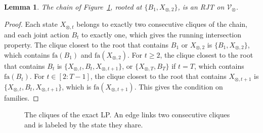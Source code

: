 \documentclass{article}
\newtheorem{lemma}{Lemma}
\begin{document}
\begin{lemma}\label{lem:chain-rjt}
The chain of Figure~\ref{fig:clique-chain}, rooted at $\{B_1, X_{\otimes,2}\}$, is an RJT on $\mathcal{V}_\otimes$.
\end{lemma}
\begin{proof}
Each state $X_{\otimes,t}$ belongs to exactly two consecutive cliques of the chain, and each joint action $B_t$ to
exactly one, which gives the running intersection property. The clique closest to the root that contains $B_1$ or
$X_{\otimes,2}$ is $\{B_1, X_{\otimes,2}\}$, which contains $\mathrm{fa}(B_1)$ and $\mathrm{fa}(X_{\otimes,2})$. For $t
\ge 2$, the clique closest to the root that contains $B_t$ is $\{X_{\otimes,t}, B_t, X_{\otimes,t+1}\}$, or $\{X_{\otimes,T},
B_T\}$ if $t = T$, which contains $\mathrm{fa}(B_t)$. For $t \in [2:T-1]$, the clique closest to the root that contains
$X_{\otimes,t+1}$ is $\{X_{\otimes,t}, B_t, X_{\otimes,t+1}\}$, which is $\mathrm{fa}(X_{\otimes,t+1})$. This gives the
condition on families.
\end{proof}

\begin{figure}[h]
\centering
{}
\caption{The cliques of the exact LP. An edge links two consecutive cliques and is labeled by the state they share.}
\label{fig:clique-chain}
\end{figure}
\end{document}
